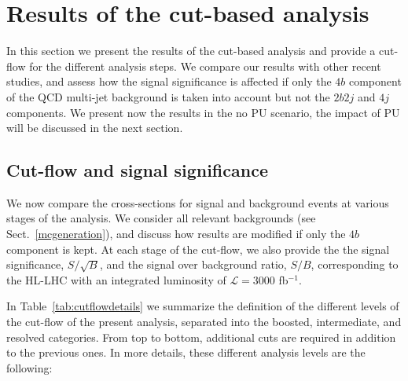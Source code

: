 
\section{Results of the cut-based analysis}

\label{sec:results}

In this section we present the results of the 
cut-based analysis and provide a
cut-flow for the different analysis steps.
%
We
compare our results with other recent studies,
and assess how the signal significance
is affected if only the $4b$ component of the
QCD multi-jet background is taken into account but not 
the $2b2j$ and $4j$ components.
%
We present now the results in the no PU scenario, the impact
of PU will be discussed in the next section.


\subsection{Cut-flow and signal significance}

We now compare the cross-sections for
signal and background events at various
stages of the analysis.
%
We consider all relevant backgrounds (see Sect.~\ref{mcgeneration}),
and discuss how results are modified if only the $4b$
component is kept.
%
At each stage of the cut-flow, we also provide the
the signal significance, $S/\sqrt{B}$, and the signal
over background ratio, $S/B$, corresponding to the
 HL-LHC with
an integrated luminosity of $\mathcal{L}
=3000$ fb$^{-1}$.


In Table~\ref{tab:cutflowdetails}
we summarize the definition of the different
levels of the cut-flow of the present analysis,
separated into the boosted, intermediate,
    and resolved categories.
    From top to bottom, additional cuts are required in addition
    to the previous ones.
    In more details, these different analysis levels are the following:
   

